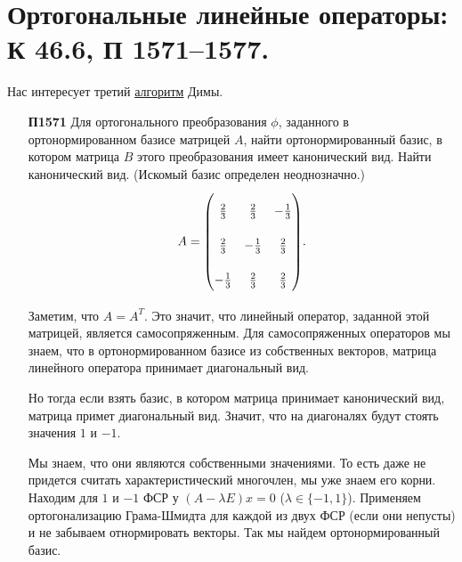 \documentclass[a4paper]{article}
\begin{document}
    \newpage
    \section{Ортогональные линейные операторы: К 46.6, П 1571–1577.}

    Нас интересует третий \href{https://docviewer.yandex.ru/view/286099993/?page=2&*=2bjDoGK8PW%2FggxgTJGXiN51nVBl7InVybCI6InlhLWRpc2stcHVibGljOi8vNVhNeGdORnVtNjBWcGRJV04vVzdCbTYzMU9POUZCYUswWktLSWxGVk85aG96dCt3Zlg4Q2pOcCs0NWpHMnh4Q3EvSjZicG1SeU9Kb25UM1ZvWG5EYWc9PTovU2VtaW5hcjMxX2FsZ29yaXRobXMucGRmIiwidGl0bGUiOiJTZW1pbmFyMzFfYWxnb3JpdGhtcy5wZGYiLCJub2lmcmFtZSI6ZmFsc2UsInVpZCI6IjI4NjA5OTk5MyIsInRzIjoxNTkxNzQ1NjI3MDEzLCJ5dSI6IjU0Mjk1MDEzNDE1NjU1MjYzNjIifQ%3D%3D}{алгоритм} Димы.

    \begin{enumerate}
    \item[\textbf{П1571}]
        Для ортогонального преобразования $\phi$, заданного в ортонормированном базисе матрицей $A$, найти ортонормированный базис, в котором матрица $B$ этого преобразования имеет канонический вид. Найти канонический вид. (Искомый базис определен неоднозначно.)
        \begin{equation*}
            A = {\renewcommand{\arraystretch}{2.3}\begin{pmatrix}
                \frac{2}{3} & \frac{2}{3} & -\frac{1}{3} \\
                \frac{2}{3} & -\frac{1}{3} & \frac{2}{3} \\
                -\frac{1}{3} & \frac{2}{3} & \frac{2}{3} \\
            \end{pmatrix}}.
        \end{equation*}

        \begin{solution}
            Заметим, что $A = A^T$. Это значит, что линейный оператор, заданной этой матрицей, является самосопряженным. Для самосопряженных операторов мы знаем, что в ортонормированном базисе из собственных векторов, матрица линейного оператора принимает диагональный вид.

            Но тогда если взять базис, в котором матрица принимает канонический вид, матрица примет диагональный вид. Значит, что на диагоналях будут стоять значения $1$ и $-1$.

            Мы знаем, что они являются собственными значениями. То есть даже не придется считать характеристический многочлен, мы уже знаем его корни. Находим для $1$ и $-1$ ФСР у $(A - \lambda E) x = 0$ ($\lambda \in \{-1, 1\}$). Применяем ортогонализацию Грама-Шмидта для каждой из двух ФСР (если они непусты) и не забываем отнормировать векторы. Так мы найдем ортонормированный базис. 
            

\end{solution}
\end{enumerate}
\end{document}
